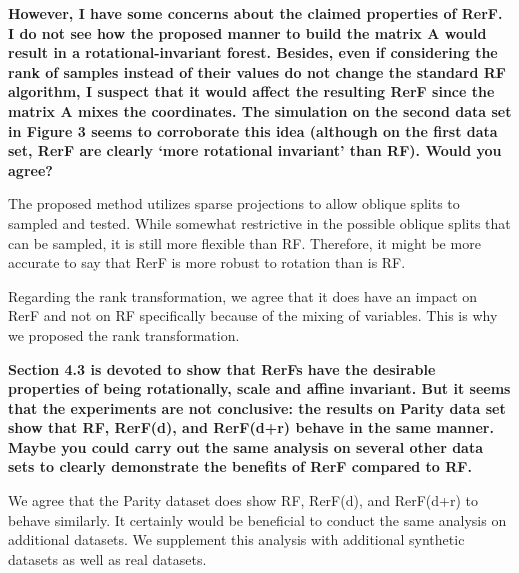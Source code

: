 \textbf{However, I have some concerns about the claimed properties of RerF. I do not see how the proposed manner to build the matrix A would result in a rotational-invariant forest. Besides, even if considering the rank of samples instead of their values do not change the standard RF algorithm, I suspect that it would affect the resulting RerF since the matrix A mixes the coordinates. The simulation on the second data set in Figure 3 seems to corroborate this idea (although on the first data set, RerF are clearly `more rotational invariant' than RF). Would you agree?}

The proposed method utilizes sparse projections to allow oblique splits to sampled and tested. While somewhat restrictive in the possible oblique splits that can be sampled, it is still more flexible than RF. Therefore, it might be more accurate to say that RerF is more robust to rotation than is RF.

Regarding the rank transformation, we agree that it does have an impact on RerF and not on RF specifically because of the mixing of variables. This is why we proposed the rank transformation. 

\textbf{Section 4.3 is devoted to show that RerFs have the desirable properties of being rotationally, scale and affine invariant. But it seems that the experiments are not conclusive: the results on Parity data set show that RF, RerF(d), and RerF(d+r) behave in the same manner. Maybe you could carry out the same analysis on several other data sets to clearly demonstrate the benefits of RerF compared to RF.}

We agree that the Parity dataset does show RF, RerF(d), and RerF(d+r) to behave similarly. It certainly would be beneficial to conduct the same analysis on additional datasets. We supplement this analysis with additional synthetic datasets as well as real datasets.

